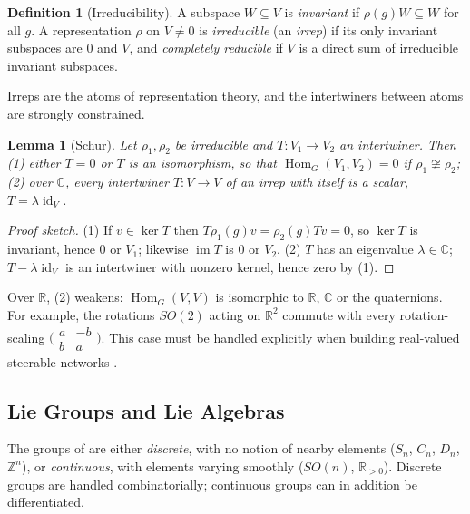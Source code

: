 \documentclass[11pt]{article}
\theoremstyle{plain}
\newtheorem{Lemma}{Lemma}[section]
\theoremstyle{definition}
\newtheorem{Definition}{Definition}[section]
\begin{document}
\begin{Definition}[Irreducibility]\label{def:irrep}
A subspace $W\subseteq V$ is \emph{invariant} if $\rho(g)W\subseteq W$ for all $g$.
A representation $\rho$ on $V\neq 0$ is \emph{irreducible} (an \emph{irrep}) if its only invariant subspaces are $0$ and $V$, and \emph{completely reducible} if $V$ is a direct sum of irreducible invariant subspaces.
\end{Definition}

Irreps are the atoms of representation theory, and the intertwiners between atoms are strongly constrained.

\begin{Lemma}[Schur]\label{lem:schur}
Let $\rho_1,\rho_2$ be irreducible and $T : V_1\to V_2$ an intertwiner. Then
(1) either $T = 0$ or $T$ is an isomorphism, so that $\operatorname{Hom}_G(V_1,V_2) = 0$ if $\rho_1\not\cong\rho_2$;
(2) over $\mathbb{C}$, every intertwiner $T : V\to V$ of an irrep with itself is a scalar, $T = \lambda\operatorname{id}_V$.
\end{Lemma}
\begin{proof}[Proof sketch]
(1) If $v\in\ker T$ then $T\rho_1(g)v = \rho_2(g)Tv = 0$, so $\ker T$ is invariant, hence $0$ or $V_1$; likewise $\operatorname{im}T$ is $0$ or $V_2$.
(2) $T$ has an eigenvalue $\lambda\in\mathbb{C}$; $T-\lambda\operatorname{id}_V$ is an intertwiner with nonzero kernel, hence zero by (1).
\end{proof}

Over $\mathbb{R}$, (2) weakens: $\operatorname{Hom}_G(V,V)$ is isomorphic to $\mathbb{R}$, $\mathbb{C}$ or the quaternions.
For example, the rotations $SO(2)$ acting on $\mathbb{R}^2$ commute with every rotation-scaling $\bigl(\begin{smallmatrix}a&-b\\b&a\end{smallmatrix}\bigr)$.
This case must be handled explicitly when building real-valued steerable networks \citep{weiler2019anips}.


\subsection{Lie Groups and Lie Algebras}
\label{subsubsec:lie-groups}

The groups of  are either \emph{discrete}, with no notion of nearby elements ($S_n$, $C_n$, $D_n$, $\mathbb{Z}^n$), or \emph{continuous}, with elements varying smoothly ($SO(n)$, $\mathbb{R}_{>0}$).
Discrete groups are handled combinatorially; continuous groups can in addition be differentiated.
\end{document}
